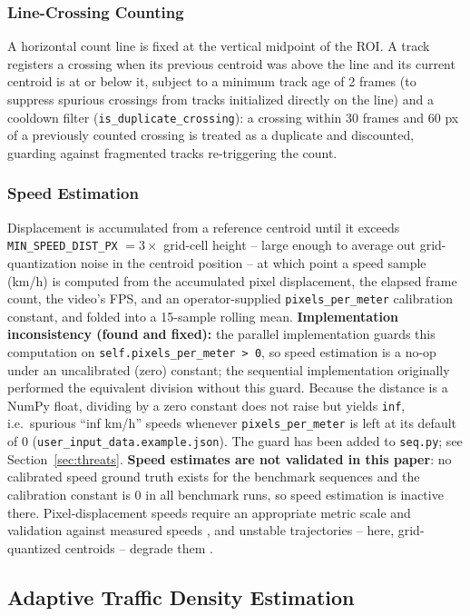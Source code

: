 \documentclass[conference]{IEEEtran}
\newcommand{\code}[1]{\texttt{#1}}
\begin{document}
\subsubsection{Line-Crossing Counting}
A horizontal count line is fixed at the vertical midpoint of the ROI. A
track registers a crossing when its previous centroid was above the
line and its current centroid is at or below it, subject to a minimum
track age of 2 frames (to suppress spurious crossings from tracks
initialized directly on the line) and a cooldown filter
(\code{is\_duplicate\_crossing}): a crossing within 30 frames and 60 px
of a previously counted crossing is treated as a duplicate and
discounted, guarding against fragmented tracks re-triggering the count.

\subsubsection{Speed Estimation}
\label{sec:speed}
Displacement is accumulated from a reference centroid until it exceeds
\code{MIN\_SPEED\_DIST\_PX} $= 3\times$ grid-cell height -- large enough
to average out grid-quantization noise in the centroid position -- at
which point a speed sample (km/h) is computed from the accumulated pixel
displacement, the elapsed frame count, the video's FPS, and an
operator-supplied \code{pixels\_per\_meter} calibration constant, and
folded into a 15-sample rolling mean. \textbf{Implementation
inconsistency (found and fixed):} the parallel implementation guards
this computation on \code{self.pixels\_per\_meter > 0}, so speed
estimation is a no-op under an uncalibrated (zero) constant; the
sequential implementation originally performed the equivalent division
without this guard. Because the distance is a NumPy float, dividing by a
zero constant does not raise but yields \code{inf}, i.e.\ spurious
``inf km/h'' speeds whenever \code{pixels\_per\_meter} is left at its
default of 0 (\code{user\_input\_data.example.json}). The guard has been
added to \code{seq.py}; see Section~\ref{sec:threats}. \textbf{Speed
estimates are not validated in this paper}: no calibrated speed ground
truth exists for the benchmark sequences and the calibration constant is
0 in all benchmark runs, so speed estimation is inactive there.
Pixel-displacement speeds require an appropriate metric scale and
validation against measured speeds \cite{kamil2024}, and unstable
trajectories -- here, grid-quantized centroids -- degrade them
\cite{sangsuwan2024}.

\subsection{Adaptive Traffic Density Estimation}
\label{sec:density}
\end{document}

